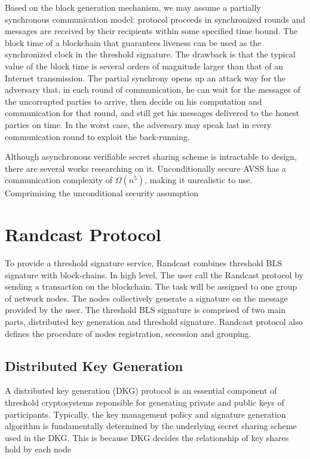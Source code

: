 \documentclass[11pt]{article}
\begin{document}
Based on the block generation mechanism, we may assume a partially synchronous communication model: protocol proceeds in synchronized rounds and messages are received by their recipients within some specified time bound. The block time of a blockchain that guarantees liveness can be used as the synchronized clock in the threshold signature. The drawback is that the typical value of the block time is several orders of magnitude larger than that of an Internet transmission. The partial synchrony opens up an attack way for the adversary that, in each round of communication, he can wait for the messages of the uncorrupted parties to arrive, then decide on his computation and communication for that round, and still get his messages delivered to the honest parties on time. In the worst case, the adversary may speak last in every communication round to exploit the back-running.

Although asynchronous verifiable secret sharing scheme is intractable to design, there are several works researching on it. Unconditionally secure AVSS has a communication complexity of $\Omega(n^5)$, making it unrealistic to use. Comprimising the unconditional security assumption 

\section{Randcast Protocol}

To provide a threshold signature service, Randcast combines threshold BLS signature with block-chains. In high level, The user call the Randcast protocol by sending a transaction on the blockchain. The task will be assigned to one group of network nodes. The nodes collectively generate a signature on the message provided by the user. The threshold BLS signature is comprised of two main parts, distributed key generation and threshold signature. Randcast protocol also defines the procedure of nodes registration, secession and grouping.

\subsection{Distributed Key Generation}

A distributed key generation (DKG) protocol is an essential component of threshold cryptosystems reponsible for generating private and public keys of participants. Typically, the key management policy and signature generation algorithm is fundamentally determined by the underlying secret sharing scheme used in the DKG. This is because DKG decides the relationship of key shares hold by each node
\end{document}
